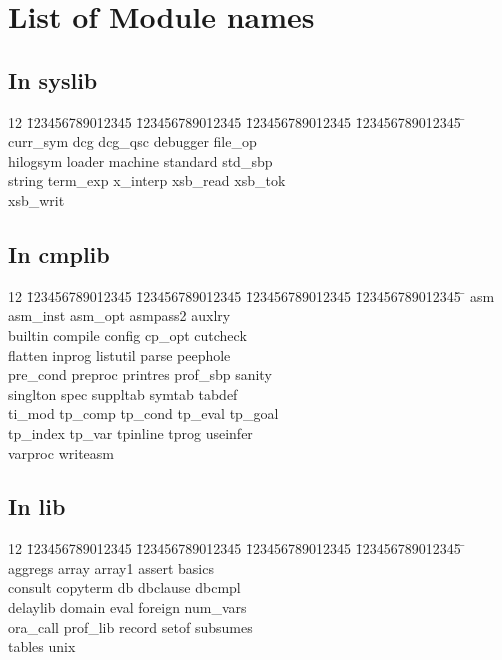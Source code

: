 \chapter{List of Module names} \label{module_names}

\section{In syslib}

\begin{tabbing}
12 \= 123456789012345 \= 123456789012345 \= 123456789012345 \= 123456789012345 \= \kill
 \> curr\_sym	\> dcg		\> dcg\_qsc	\> debugger	\> file\_op	\\
 \> hilogsym	\> loader	\> machine	\> standard	\> std\_sbp	\\
 \> string	\> term\_exp	\> x\_interp	\> xsb\_read	\> xsb\_tok	\\
 \> xsb\_writ
\end{tabbing}


\section{In cmplib}

\begin{tabbing}
12 \= 123456789012345 \= 123456789012345 \= 123456789012345 \= 123456789012345 \= \kill
 \> asm		\> asm\_inst	\> asm\_opt	\> asmpass2	\> auxlry	\\
 \> builtin	\> compile	\> config	\> cp\_opt	\> cutcheck	\\
 \> flatten	\> inprog	\> listutil	\> parse	\> peephole	\\
 \> pre\_cond	\> preproc	\> printres	\> prof\_sbp	\> sanity	\\
 \> singlton	\> spec		\> suppltab	\> symtab	\> tabdef	\\
 \> ti\_mod	\> tp\_comp	\> tp\_cond	\> tp\_eval	\> tp\_goal	\\
 \> tp\_index	\> tp\_var	\> tpinline	\> tprog	\> useinfer	\\
 \> varproc	\> writeasm
\end{tabbing}


\section{In lib}

\begin{tabbing}
12 \= 123456789012345 \= 123456789012345 \= 123456789012345 \= 123456789012345 \= \kill
 \> aggregs	\> array	\> array1	\> assert	\> basics	\\
 \> consult	\> copyterm	\> db		\> dbclause	\> dbcmpl	\\
 \> delaylib	\> domain	\> eval		\> foreign	\> num\_vars	\\
 \> ora\_call	\> prof\_lib	\> record	\> setof	\> subsumes	\\
 \> tables	\> unix
\end{tabbing}

